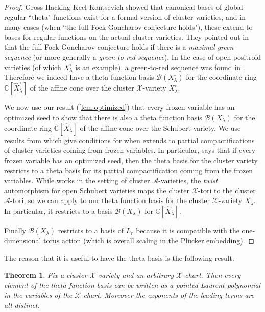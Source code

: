 \documentclass{amsart}
\newtheorem{theorem}[thm]{Theorem}
\theoremstyle{definition}
\numberwithin{equation}{section}
\newcommand{\C}{\mathbb{C}}
\begin{document}
\begin{proof}
Gross-Hacking-Keel-Kontsevich \cite[Theorem 0.3]{GHKK} showed that canonical bases of global regular
``theta" functions exist for a formal version of cluster varieties, and in many cases
(when ``the full Fock-Goncharov conjecture holds"), these extend to bases for regular functions
on the actual cluster varieties.  
They pointed out 
in \cite[Proposition 8.28 and Cor 8.30]{GHKK} 
that the full Fock-Goncharov 
conjecture holds if
there is a \emph{maximal green sequence}
(or more generally a \emph{green-to-red sequence}).
In the case of open positroid varieties
(of which $X_{\lambda}^{\circ}$ is an example),
a green-to-red sequence was found in
 \cite[Theorem 1.2]{FordSer}.
Therefore 
we indeed have a theta function basis 
$\mathcal{B}(X_{\lambda}^\circ)$ for 
the coordinate ring $\C[\widehat{X}_{\lambda}^\circ]$ 
of the affine cone over the cluster $\mathcal{X}$-variety
$X_{\lambda}^{\circ}$.

We now use our result (\cref{lem:optimized})
that every frozen variable has an optimized seed to 
show that there is also a theta function basis
$\mathcal{B}(X_{\lambda})$
for the  coordinate ring
$\C[\widehat{X}_{\lambda}]$ of the affine cone over the Schubert variety.
We use results from \cite[Section 9]{GHKK}
which give conditions for when  \cite[Theorem 0.3]{GHKK} extends to partial compactifications of cluster
varieties coming from frozen variables.  In particular, 
\cite[Corollary 9.17]{GHKK} says that if every frozen variable 
has an optimized seed, then the theta basis for the cluster variety 
restricts to a theta basis for its partial compactification 
coming from the frozen variables.  While \cite[Section 9]{GHKK} 
works in the setting of cluster $\mathcal{A}$-varieties, 
the \emph{twist} automorphism \cite[Theorem 7.1]{MullerSpeyer} for open Schubert varieties
maps the cluster $\mathcal{X}$-tori to the cluster $\mathcal{A}$-tori,
so  we can apply 
\cite[Corollary 9.17]{GHKK} to our theta function basis for the 
cluster $\mathcal{X}$-variety $X_{\lambda}^{\circ}$.
In particular, it 
 restricts to a basis 
$\mathcal{B}(X_{\lambda})$
for $\C[\widehat{X}_{\lambda}]$.

Finally $\mathcal{B} (X_{\lambda})$
restricts to a basis of $L_r$ because it is compatible with the
one-dimensional
torus action (which is overall scaling in the
Pl\"ucker embedding).
\end{proof}


The reason that it is useful to have the theta basis is the following result.
\begin{theorem} \cite[Theorem 16.15]{RW} \label{thm:pointed}
Fix a cluster $\mathcal{X}$-variety and an arbitrary $\mathcal{X}$-chart.
Then every element of the theta function basis can be written as a pointed Laurent
polynomial in the variables of the $\mathcal{X}$-chart.  Moreover the exponents
of the leading terms are all distinct.
\end{theorem}
\end{document}
